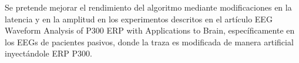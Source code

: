 \documentclass[../00_Main.tex]{subfiles}
\begin{document}
Se pretende mejorar el rendimiento del algoritmo mediante modificaciones en la latencia y en la amplitud en los experimentos descritos en el artículo EEG Waveform Analysis of P300 ERP with Applications to Brain, específicamente en los EEGs de pacientes pasivos, donde la traza es modificada de manera artificial inyectándole ERP P300.


\biblio %
\end{document}
